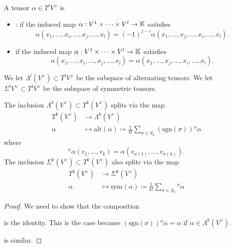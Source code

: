 \begin{definition*}
    A tensor \(\alpha\in T^l V^\vee\) is 
    \begin{itemize}
        \item {}: if the induced map \(\alpha:V^1\times \dots\times V^l\to\mathbb{K}\) satisfies 
            \[\alpha(x_1,\dots,x_i,\dots,x_j,\dots,x_l)=(-1)^{j-i}\alpha(x_1,\dots,x_j,\dots,x_i,\dots,x_l).\]
        \item {} if the induced map \(\alpha:V^1\times \dots\times V^l\to\mathbb{K}\) satisfies 
            \[\alpha(x_1,\dots,x_i,\dots,x_j,\dots,x_l)=\alpha(x_1,\dots,x_j,\dots,x_i,\dots,x_l).\]
    \end{itemize}
    We let \(\Lambda^l(V^\vee)\subset T^l V^\vee\) be the subspace of alternating tensors. We let \(\Sigma^lV^\vee\subset T^l V^\vee\)
    be the subspace of symmetric tensors.
\end{definition*}



\begin{lemma}\label{lem:8.1}
     The inclusion \(\Lambda^k(V^\vee)\subset T^k(V^\vee)\) splits via the map 
    \begin{align*}
        T^k(V^\vee)&\to \Lambda^k(V^\vee)\\
        \alpha&\mapsto \text{alt}(\alpha)\coloneqq \frac{1}{k!}\sum_{\sigma\in S_k}(\text{sgn}(\sigma)) {}^\sigma \alpha
    \end{align*}
    where \[^\sigma \alpha(v_1,\dots,v_k)=\alpha(v_{{\sigma(1)}},\dots,v_{{\sigma(k)}}).\]
     The inclusion \(\Sigma^k(V^\vee)\subset T^k(V^\vee)\) also splits via the map 
    \begin{align*}
        T^k(V^\vee)&\to \Sigma^k(V^\vee)\\
        \alpha & \mapsto \text{sym}(\alpha)\coloneqq \frac{1}{k!}\sum_{\sigma\in S_k} {}^\sigma \alpha
    \end{align*}  
\end{lemma}

\begin{proof}
     We need to show that the composition
    \begin{center}
    \end{center}
    is the identity. This is the case because \((\text{sgn}(\sigma)) {}^\sigma\alpha=\alpha\) if \(\alpha \in \Lambda^k(V^\vee)\).

     is similar.
\end{proof}

